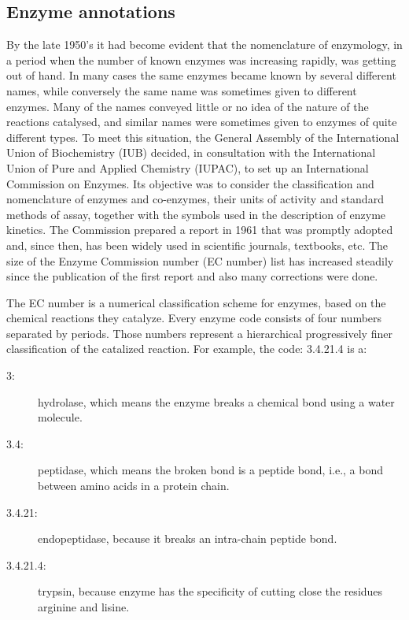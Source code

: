 \subsection{Enzyme annotations}

By the late 1950's it had become evident that the nomenclature of enzymology, in a period when the number of known enzymes was increasing rapidly, was getting out of hand. In many cases the same enzymes became known by several different names, while conversely the same name was sometimes given to different enzymes. Many of the names conveyed little or no idea of the nature of the reactions catalysed, and similar names were sometimes given to enzymes of quite different types. To meet this situation, the General Assembly of the International Union of Biochemistry (IUB) decided, in consultation with the International Union of Pure and Applied Chemistry (IUPAC), to set up an International Commission on Enzymes. Its objective was to consider the classification and nomenclature of enzymes and co-enzymes, their units of activity and standard methods of assay, together with the symbols used in the description of enzyme kinetics. The Commission prepared a report in 1961 that was promptly adopted and, since then, has been widely used in scientific journals, textbooks, etc. The size of the Enzyme Commission number (EC number) list has increased steadily since the publication of the first report and also many corrections were done.

The EC number is a numerical classification scheme for enzymes, based on the chemical reactions they catalyze. Every enzyme code consists of four numbers separated by periods. Those numbers represent a hierarchical progressively finer classification of the catalized reaction. For example, the code: 3.4.21.4 is a:
\begin{description}
\item [3:] hydrolase, which means the enzyme breaks a chemical bond using a water molecule.
\item [3.4:] peptidase, which means the broken bond is a peptide bond, i.e., a bond between amino acids in a protein chain.
\item [3.4.21:] endopeptidase, because it breaks an intra-chain peptide bond.
\item [3.4.21.4:] trypsin, because enzyme has the specificity of cutting close the residues arginine and lisine.
\end{description}


